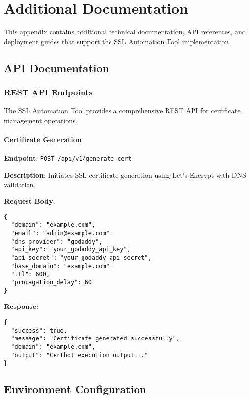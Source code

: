 
\chapter{Additional Documentation} %

\label{AppendixC} %


This appendix contains additional technical documentation, API references, and deployment guides that support the SSL Automation Tool implementation.

\section{API Documentation}

\subsection{REST API Endpoints}

The SSL Automation Tool provides a comprehensive REST API for certificate management operations.

\subsubsection{Certificate Generation}

\textbf{Endpoint}: \texttt{POST /api/v1/generate-cert}

\textbf{Description}: Initiates SSL certificate generation using Let's Encrypt with DNS validation.

\textbf{Request Body}:
\begin{verbatim}
{
  "domain": "example.com",
  "email": "admin@example.com",
  "dns_provider": "godaddy",
  "api_key": "your_godaddy_api_key",
  "api_secret": "your_godaddy_api_secret",
  "base_domain": "example.com",
  "ttl": 600,
  "propagation_delay": 60
}
\end{verbatim}

\textbf{Response}:
\begin{verbatim}
{
  "success": true,
  "message": "Certificate generated successfully",
  "domain": "example.com",
  "output": "Certbot execution output..."
}
\end{verbatim}

\section{Environment Configuration}

